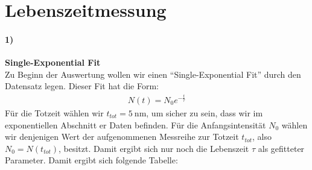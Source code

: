 \section{Lebenszeitmessung}
\label{sec:lebenszeit}
\paragraph{1)}\textbf{Single-Exponential Fit}\\
Zu Beginn der Auswertung wollen wir einen \enquote{Single-Exponential Fit} durch den Datensatz legen. Dieser Fit hat die Form:
\begin{gather}
    N(t) = N_0e^{-\frac{t}{\tau}}
\end{gather}
Für die Totzeit wählen wir $t_{tot}=\SI{5}{\nano\metre}$, um sicher zu sein, dass wir im exponentiellen Abschnitt er Daten befinden. Für die Anfangsintensität $N_0$ wählen wir denjenigen Wert der aufgenommenen Messreihe zur Totzeit $t_{tot}$, also $N_0=N(t_{tot})$, besitzt. Damit ergibt sich nur noch die Lebenszeit $\tau$ als gefitteter Parameter. Damit ergibt sich folgende Tabelle:

